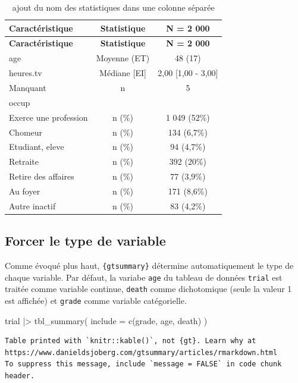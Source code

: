 \documentclass[
  letterpaper,
  DIV=11,
  numbers=noendperiod,
  oneside]{scrreprt}
\newenvironment{Shaded}{\begin{snugshade}}{\end{snugshade}}
\newcommand{\AttributeTok}[1]{\textcolor[rgb]{0.40,0.45,0.13}{#1}}
\newcommand{\FunctionTok}[1]{\textcolor[rgb]{0.28,0.35,0.67}{#1}}
\newcommand{\NormalTok}[1]{\textcolor[rgb]{0.00,0.23,0.31}{#1}}
\newcommand{\SpecialCharTok}[1]{\textcolor[rgb]{0.37,0.37,0.37}{#1}}
\begin{document}
\hypertarget{tbl-stat-nom-3}{}
\begin{longtable}[]{@{}lcc@{}}
\caption{\label{tbl-stat-nom-3}ajout du nom des statistiques dans une
colonne séparée}\tabularnewline
\toprule()
\textbf{Caractéristique} & \textbf{Statistique} & \textbf{N = 2 000} \\
\midrule()
\endfirsthead
\toprule()
\textbf{Caractéristique} & \textbf{Statistique} & \textbf{N = 2 000} \\
\midrule()
\endhead
age & Moyenne (ET) & 48 (17) \\
heures.tv & Médiane {[}EI{]} & 2,00 {[}1,00 - 3,00{]} \\
Manquant & n & 5 \\
occup & & \\
Exerce une profession & n (\%) & 1 049 (52\%) \\
Chomeur & n (\%) & 134 (6,7\%) \\
Etudiant, eleve & n (\%) & 94 (4,7\%) \\
Retraite & n (\%) & 392 (20\%) \\
Retire des affaires & n (\%) & 77 (3,9\%) \\
Au foyer & n (\%) & 171 (8,6\%) \\
Autre inactif & n (\%) & 83 (4,2\%) \\
\bottomrule()
\end{longtable}

\hypertarget{forcer-le-type-de-variable}{%
\subsection{Forcer le type de
variable}\label{forcer-le-type-de-variable}}

Comme évoqué plus haut, \texttt{\{gtsummary\}} détermine automatiquement
le type de chaque variable. Par défaut, la variabe \texttt{age} du
tableau de données \texttt{trial} est traitée comme variable continue,
\texttt{death} comme dichotomique (seule la valeur 1 est affichée) et
\texttt{grade} comme variable catégorielle.

\begin{Shaded}
\begin{Highlighting}[]
\NormalTok{trial }\SpecialCharTok{|\textgreater{}}
  \FunctionTok{tbl\_summary}\NormalTok{(}
    \AttributeTok{include =} \FunctionTok{c}\NormalTok{(grade, age, death)}
\NormalTok{  )}
\end{Highlighting}
\end{Shaded}

\begin{verbatim}
Table printed with `knitr::kable()`, not {gt}. Learn why at
https://www.danieldsjoberg.com/gtsummary/articles/rmarkdown.html
To suppress this message, include `message = FALSE` in code chunk header.
\end{verbatim}
\end{document}
